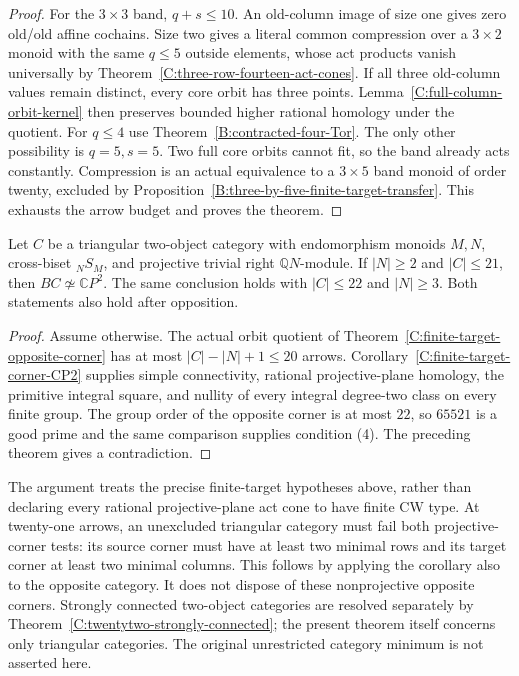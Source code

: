 \begin{proof}
For the $3\times3$ band, $q+s\leq10$.
An old-column image of size one gives zero old/old affine cochains.
Size two gives a literal common compression over a $3\times2$
monoid with the same $q\leq5$ outside elements, whose act products
vanish universally by Theorem~\ref{C:three-row-fourteen-act-cones}.
If all three old-column values remain distinct, every core orbit
has three points. Lemma~\ref{C:full-column-orbit-kernel} then
preserves bounded higher rational homology under the quotient.
For $q\leq4$ use Theorem~\ref{B:contracted-four-Tor}.
The only other possibility is $q=5,s=5$. Two full core orbits
cannot fit, so the band already acts constantly. Compression is an
actual equivalence to a $3\times5$ band monoid of order twenty,
excluded by Proposition~\ref{B:three-by-five-finite-target-transfer}.
This exhausts the arrow budget and proves the theorem.
\end{proof}

\begin{corollary}
\label{C:projective-opposite-corner-twenty-one}
Let $C$ be a triangular two-object category with endomorphism monoids
$M,N$, cross-biset ${}_NS_M$, and projective trivial right
$\mathbb QN$-module. If $|N|\geq2$ and $|C|\leq21$, then
$BC\not\simeq\mathbb CP^2$.
The same conclusion holds with $|C|\leq22$ and $|N|\geq3$.
Both statements also hold after opposition.
\end{corollary}
\begin{proof}
Assume otherwise. The actual orbit quotient of
Theorem~\ref{C:finite-target-opposite-corner} has at most
$|C|-|N|+1\leq20$ arrows.
Corollary~\ref{C:finite-target-corner-CP2} supplies simple
connectivity, rational projective-plane homology, the primitive
integral square, and nullity of every integral degree-two class
on every finite group. The group order of the opposite corner
is at most $22$, so $65521$ is a good prime and the same comparison
supplies condition (4). The preceding theorem gives a contradiction.
\end{proof}

\begin{remark}
\label{C:finite-target-small-act-scope}
The argument treats the precise finite-target hypotheses above,
rather than declaring every rational projective-plane act cone to
have finite CW type. At twenty-one arrows, an unexcluded triangular
category must fail both projective-corner tests: its source corner
must have at least two minimal rows and its target corner at least
two minimal columns. This follows by applying the corollary also
to the opposite category. It does not dispose of these nonprojective
opposite corners. Strongly connected two-object categories are resolved
separately by Theorem~\ref{C:twentytwo-strongly-connected}; the
present theorem itself concerns only triangular categories. The
original unrestricted category minimum is not asserted here.
\end{remark}
